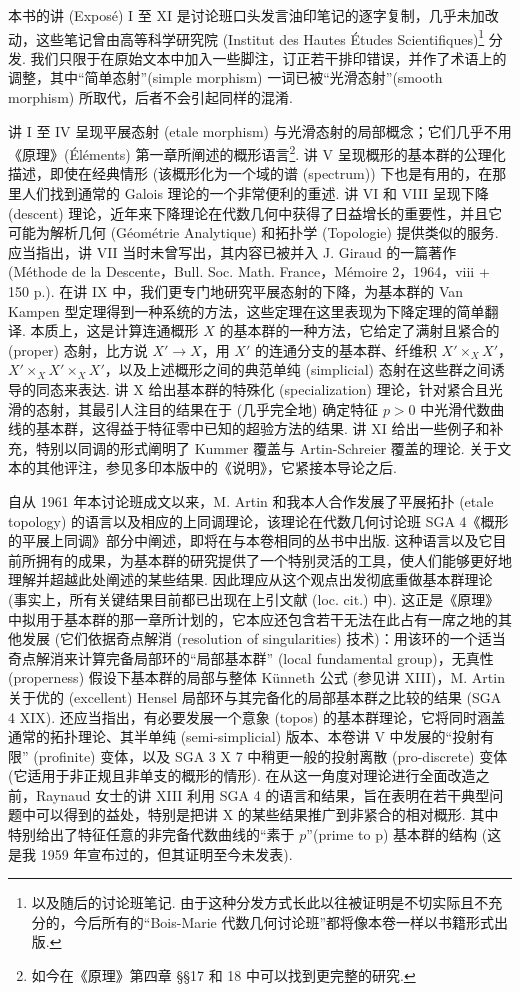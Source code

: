 本书的讲 (Exposé) I 至 XI 是讨论班口头发言油印笔记的逐字复制，几乎未加改动，这些笔记曾由高等科学研究院 (Institut des Hautes Études Scientifiques)\footnote{以及随后的讨论班笔记. 由于这种分发方式长此以往被证明是不切实际且不充分的，今后所有的``Bois-Marie 代数几何讨论班''都将像本卷一样以书籍形式出版.} 分发. 我们只限于在原始文本中加入一些脚注，订正若干排印错误，并作了术语上的调整，其中``简单态射''(simple morphism) 一词已被``光滑态射''(smooth morphism) 所取代，后者不会引起同样的混淆.

讲 I 至 IV 呈现平展态射 (etale morphism) 与光滑态射的局部概念；它们几乎不用《原理》(Éléments) 第一章所阐述的概形语言\footnote{如今在《原理》第四章 §§17 和 18 中可以找到更完整的研究.}. 讲 V 呈现概形的基本群的公理化描述，即使在经典情形 (该概形化为一个域的谱 (spectrum)) 下也是有用的，在那里人们找到通常的 Galois 理论的一个非常便利的重述. 讲 VI 和 VIII 呈现下降 (descent) 理论，近年来下降理论在代数几何中获得了日益增长的重要性，并且它可能为解析几何 (Géométrie Analytique) 和拓扑学 (Topologie) 提供类似的服务. 应当指出，讲 VII 当时未曾写出，其内容已被并入 J. Giraud 的一篇著作 (Méthode de la Descente，Bull. Soc. Math. France，Mémoire 2，1964，viii + 150 p.). 在讲 IX 中，我们更专门地研究平展态射的下降，为基本群的 Van Kampen 型定理得到一种系统的方法，这些定理在这里表现为下降定理的简单翻译. 本质上，这是计算连通概形 $X$ 的基本群的一种方法，它给定了满射且紧合的 (proper) 态射，比方说 $X' \to X$，用 $X'$ 的连通分支的基本群、纤维积 $X' \times_X X'$，$X' \times_X X' \times_X X'$，以及上述概形之间的典范单纯 (simplicial) 态射在这些群之间诱导的同态来表达. 讲 X 给出基本群的特殊化 (specialization) 理论，针对紧合且光滑的态射，其最引人注目的结果在于 (几乎完全地) 确定特征 $p > 0$ 中光滑代数曲线的基本群，这得益于特征零中已知的超验方法的结果. 讲 XI 给出一些例子和补充，特别以同调的形式阐明了 Kummer 覆盖与 Artin-Schreier 覆盖的理论. 关于文本的其他评注，参见多印本版中的《说明》，它紧接本导论之后.

自从 1961 年本讨论班成文以来，M. Artin 和我本人合作发展了平展拓扑 (etale topology) 的语言以及相应的上同调理论，该理论在代数几何讨论班 SGA 4《概形的平展上同调》部分中阐述，即将在与本卷相同的丛书中出版. 这种语言以及它目前所拥有的成果，为基本群的研究提供了一个特别灵活的工具，使人们能够更好地理解并超越此处阐述的某些结果. 因此理应从这个观点出发彻底重做基本群理论 (事实上，所有关键结果目前都已出现在上引文献 (loc. cit.) 中). 这正是《原理》中拟用于基本群的那一章所计划的，它本应还包含若干无法在此占有一席之地的其他发展 (它们依据奇点解消 (resolution of singularities) 技术)：用该环的一个适当奇点解消来计算完备局部环的``局部基本群'' (local fundamental group)，无真性 (properness) 假设下基本群的局部与整体 Künneth 公式 (参见讲 XIII)，M. Artin 关于优的 (excellent) Hensel 局部环与其完备化的局部基本群之比较的结果 (SGA 4 XIX). 还应当指出，有必要发展一个意象 (topos) 的基本群理论，它将同时涵盖通常的拓扑理论、其半单纯 (semi-simplicial) 版本、本卷讲 V 中发展的``投射有限'' (profinite) 变体，以及 SGA 3 X 7 中稍更一般的投射离散 (pro-discrete) 变体 (它适用于非正规且非单支的概形的情形). 在从这一角度对理论进行全面改造之前，Raynaud 女士的讲 XIII 利用 SGA 4 的语言和结果，旨在表明在若干典型问题中可以得到的益处，特别是把讲 X 的某些结果推广到非紧合的相对概形. 其中特别给出了特征任意的非完备代数曲线的``素于 $p$''(prime to p) 基本群的结构 (这是我 1959 年宣布过的，但其证明至今未发表).

